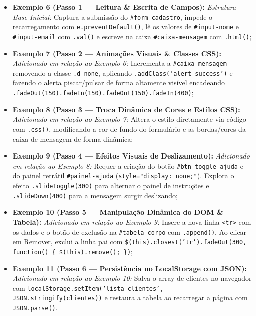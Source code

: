 \begin{itemize}
\item \textbf{Exemplo 6 (Passo 1 — Leitura \& Escrita de Campos):} \textit{Estrutura Base Inicial:} Captura a submissão do \texttt{\#form-cadastro}, impede o recarregamento com \texttt{e.preventDefault()}, lê os valores de \texttt{\#input-nome} e \texttt{\#input-email} com \texttt{.val()} e escreve na caixa \texttt{\#caixa-mensagem} com \texttt{.html()};

\item \textbf{Exemplo 7 (Passo 2 — Animações Visuais \& Classes CSS):} \textit{Adicionado em relação ao Exemplo 6:} Incrementa a \texttt{\#caixa-mensagem} removendo a classe \texttt{.d-none}, aplicando \texttt{.addClass('alert-success')} e fazendo o alerta piscar/pulsar de forma altamente visível encadeando \texttt{.fadeOut(150)\allowbreak{}.\allowbreak{}fadeIn(150)\allowbreak{}.\allowbreak{}fadeOut(150)\allowbreak{}.\allowbreak{}fadeIn(400)};

\item \textbf{Exemplo 8 (Passo 3 — Troca Dinâmica de Cores e Estilos CSS):} \textit{Adicionado em relação ao Exemplo 7:} Altera o estilo diretamente via código com \texttt{.css()}, modificando a cor de fundo do formulário e as bordas/cores da caixa de mensagem de forma dinâmica;

\item \textbf{Exemplo 9 (Passo 4 — Efeitos Visuais de Deslizamento):} \textit{Adicionado em relação ao Exemplo 8:} Requer a criação do botão \texttt{\#btn-toggle-ajuda} e do painel retrátil \texttt{\#painel-ajuda} (\texttt{style="display: none;"}). Explora o efeito \texttt{.slideToggle(300)} para alternar o painel de instruções e \texttt{.slideDown(400)} para a mensagem surgir deslizando;

\item \textbf{Exemplo 10 (Passo 5 — Manipulação Dinâmica do DOM \& Tabela):} \textit{Adicionado em relação ao Exemplo 9:} Insere a nova linha \texttt{<tr>} com os dados e o botão de exclusão na \texttt{\#tabela-corpo} com \texttt{.append()}. Ao clicar em Remover, exclui a linha pai com \texttt{\$(this).closest('tr').fadeOut(300, function() \{ \$(this).remove(); \})};

\item \textbf{Exemplo 11 (Passo 6 — Persistência no LocalStorage com JSON):} \textit{Adicionado em relação ao Exemplo 10:} Salva o array de clientes no navegador com \texttt{localStorage.setItem('lista\_clientes', JSON.stringify(clientes))} e restaura a tabela ao recarregar a página com \texttt{JSON.parse()}.
\end{itemize}


